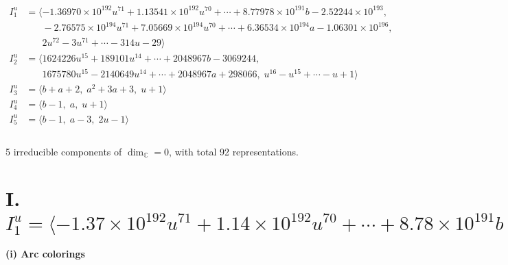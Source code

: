 \documentclass[1p]{elsarticle_modified}
\theoremstyle{definition}
\begin{document}
\begin{align*}
I^u_{1}&=\langle 
-1.36970\times10^{192} u^{71}+1.13541\times10^{192} u^{70}+\cdots+8.77978\times10^{191} b-2.52244\times10^{193},\\
\phantom{I^u_{1}}&\phantom{= \langle  }-2.76575\times10^{194} u^{71}+7.05669\times10^{194} u^{70}+\cdots+6.36534\times10^{194} a-1.06301\times10^{196},\\
\phantom{I^u_{1}}&\phantom{= \langle  }2 u^{72}-3 u^{71}+\cdots-314 u-29\rangle \\
I^u_{2}&=\langle 
1624226 u^{15}+189101 u^{14}+\cdots+2048967 b-3069244,\\
\phantom{I^u_{2}}&\phantom{= \langle  }1675780 u^{15}-2140649 u^{14}+\cdots+2048967 a+298066,\;u^{16}- u^{15}+\cdots- u+1\rangle \\
I^u_{3}&=\langle 
b+a+2,\;a^2+3 a+3,\;u+1\rangle \\
I^u_{4}&=\langle 
b-1,\;a,\;u+1\rangle \\
I^u_{5}&=\langle 
b-1,\;a-3,\;2 u-1\rangle \\
\\
\end{align*}
\raggedright * 5 irreducible components of $\dim_{\mathbb{C}}=0$, with total 92 representations.\\
\newpage
\renewcommand{\arraystretch}{1}
\centering \section*{I. $I^u_{1}= \langle -1.37\times10^{192} u^{71}+1.14\times10^{192} u^{70}+\cdots+8.78\times10^{191} b-2.52\times10^{193},\;-2.77\times10^{194} u^{71}+7.06\times10^{194} u^{70}+\cdots+6.37\times10^{194} a-1.06\times10^{196},\;2 u^{72}-3 u^{71}+\cdots-314 u-29 \rangle$}
\flushleft \textbf{(i) Arc colorings}\\
\end{document}
